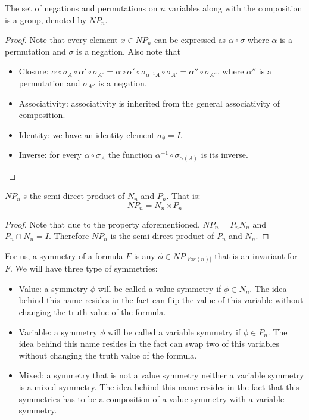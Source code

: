 {\begin{proposition}[$NP_n$]
  The set of negations and permutations on $n$ variables  along with the composition is a group, denoted by $NP_n$. 
\end{proposition}
\begin{proof}
  Note that every element $x\in NP_n$ can be expressed as $\alpha\circ \sigma$ where $\alpha$ is a permutation and $\sigma$ is a negation. Also note that 
  \begin{itemize}
    \item Closure: $\alpha\circ \sigma_{A} \circ \alpha'\circ \sigma_{A'} = \alpha \circ \alpha' \circ \sigma_{\alpha^{-1} A} \circ \sigma_{A'}  = \alpha''\circ \sigma_{A''}$, where $\alpha''$ is a permutation and $\sigma_{A''}$ is a negation.
    \item Associativity: associativity is inherited from the general associativity of composition.
    \item Identity: we have an identity element $\sigma_{\emptyset}=I$.
    \item Inverse: for every $\alpha \circ \sigma_A$ the function $\alpha^{-1}\circ \sigma_{\alpha(A)}$ is its inverse.
  \end{itemize}
\end{proof}

\begin{proposition}
  $NP_n$ s the semi-direct product of $N_n$ and $P_n$. That is:
   $$NP_n = N_n \rtimes P_n$$
 \end{proposition}
 
\begin{proof}
Note that due to the property aforementioned, $NP_n = P_nN_n$ and $P_n\cap N_n = I$. Therefore $NP_n$ is the semi direct product of $P_n$ and $N_n$.
\end{proof}

For us, a symmetry of a formula $F$ is any $\phi\in NP_{|Var(n)|}$ that is an invariant for $F$. We will have three type of symmetries:
\begin{itemize}
\item Value: a symmetry $\phi$ will be called a value symmetry if $\phi \in N_n$. The idea behind this name resides in the fact can flip the value of this variable without changing the truth value of the formula.
\item Variable: a symmetry $\phi$ will be called a variable symmetry if $\phi \in P_n$. The idea behind this name resides in the fact can swap two of this variables without changing the truth value of the formula.
\item Mixed: a symmetry that is not a value symmetry neither a variable symmetry is a mixed symmetry. The idea behind this name resides in the fact that this symmetries has to be a composition of a value symmetry with a variable symmetry.
\end{itemize}





}
